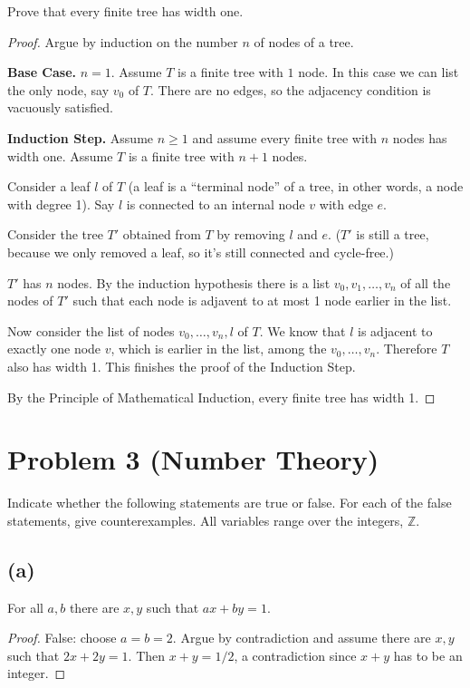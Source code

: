 \documentclass[14pt]{extarticle}
\begin{document}
Prove that every finite tree has width one.
\begin{proof}
Argue by induction on the number $n$ of nodes of a tree.

{\bf Base Case.} $n = 1$. Assume $T$ is a finite tree with $1$ node. In this case we can list the only node, say $v_0$ of $T$. There are no edges, so the adjacency condition is vacuously satisfied.

{\bf Induction Step.} Assume $n \geq 1$ and assume every finite tree with $n$ nodes has width one. Assume $T$ is a finite tree with $n+1$ nodes.

Consider a leaf $l$ of $T$ (a leaf is a ``terminal node'' of a tree, in other words, a node with degree 1). Say $l$ is connected to an internal node $v$ with edge $e$.

Consider the tree $T'$ obtained from $T$ by removing $l$ and $e$. ($T'$ is still a tree, because we only removed a leaf, so it's still connected and cycle-free.)

$T'$ has $n$ nodes. By the induction hypothesis there is a list $v_0, v_1, \ldots, v_n$ of all the nodes of $T'$ such that each node is adjavent to at most 1 node earlier in the list.

Now consider the list of nodes $v_0, \ldots, v_n, l$ of $T$. We know that $l$ is adjacent to exactly one node $v$, which is earlier in the list, among the $v_0, \ldots, v_n$. Therefore $T$ also has width 1. This finishes the proof of the Induction Step.

By the Principle of Mathematical Induction, every finite tree has width 1.
\end{proof}

\section{Problem 3 (Number Theory)}
Indicate whether the following statements are true or false. For each of the false statements, give coun­terexamples. All variables range over the integers, $\mathbb{Z}$.
\subsection{(a)}
For all $a,b$ there are $x,y$ such that $ax + by = 1$.
\begin{proof}
False: choose $a = b = 2$. Argue by contradiction and assume there are $x,y$ such that $2x + 2y = 1$. Then $x + y = 1/2$, a contradiction since $x + y$ has to be an integer.
\end{proof}
\end{document}

